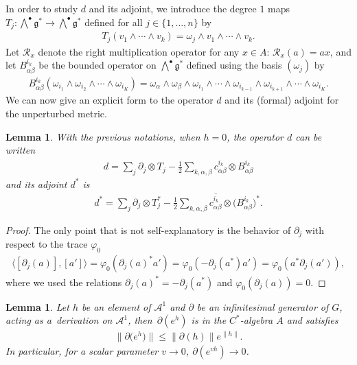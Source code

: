 \documentclass[pdftex]{sigma}
\newtheorem{Lemma}[Theorem]{Lemma}
\newcommand{\Aa}{\mathcal{A}}
\newcommand{\LieG}{\mathfrak{g}}
\newcommand{\RightMult}{\mathcal{R}}
\numberwithin{equation}{section}
\begin{document}
In order to study $d$ and its adjoint, we introduce the degree $1$ maps $T_j \colon \bigwedge^\bullet \LieG^* \to \bigwedge^\bullet \LieG^*$ def\/ined for all $j \in \{1, \ldots, n\}$ by
\begin{gather*}
T_j( v_1 \wedge \cdots \wedge v_k) = \omega_j \wedge v_1 \wedge \cdots \wedge v_k.
\end{gather*}
Let $\RightMult_{x}$ denote the right multiplication operator for any $x \in A$: $\RightMult_{x}(a) = a x$, and let $B^{i_k}_{\alpha \beta}$ be the bounded operator on $\bigwedge^\bullet \LieG^*$ def\/ined using the basis $(\omega_j)$ by
\begin{gather*}
B^{i_k}_{\alpha \beta}( \omega_{i_1} \wedge \omega_{i_2} \wedge \cdots \wedge \omega_{i_K}) = \omega_\alpha \wedge \omega_\beta \wedge \omega_{i_1} \wedge \cdots \wedge \omega_{i_{k-1}} \wedge \omega_{i_{k+1}} \wedge \cdots \wedge \omega_{i_K}.
\end{gather*}
We can now give an explicit form to the operator $d$ and its (formal) adjoint for the unperturbed metric.
\begin{Lemma}
\label{Lem:Formed}
With the previous notations, when $h = 0$, the operator $d$ can be written
\begin{gather*}
d = \sum_j \partial_j \otimes T_j - \frac{1}{2} \sum_{k,\alpha,\beta} c^{i_k}_{\alpha \beta} \otimes B^{i_k}_{\alpha \beta}
\end{gather*}
and its adjoint $d^*$ is
\begin{gather*}
d^* = \sum_j \partial_j \otimes T_j^* - \frac{1}{2} \sum_{k,\alpha, \beta} \overline{c^{i_k}_{\alpha \beta}} \otimes \big(B^{i_k}_{\alpha \beta}\big)^*.
\end{gather*}
\end{Lemma}

\begin{proof}
The only point that is not self-explanatory is the behavior of $\partial_j$ with respect to the trace $\varphi_0$
\begin{gather*}
\langle [\partial_j(a)], [a'] \rangle = \varphi_0( \partial_j(a)^* a') = \varphi_0( -\partial_j(a^*) a') = \varphi_0(a^* \partial_j(a')),
\end{gather*}
where we used the relations $\partial_j(a)^* = - \partial_j(a^*)$ and $\varphi_0( \partial_j(a)) = 0$.
\end{proof}

\begin{Lemma}
\label{Lem:CVExp}
Let $h$ be an element of $\Aa^1$ and $\partial $ be an infinitesimal generator of $G$, acting as a~derivation on $\Aa^1$, then~$\partial ( e^{h} )$ is in the $C^*$-algebra $A$ and satisfies
\begin{gather*}
\big\| \partial \big( e^{h} \big) \big\| \leqslant \| \partial (h) \| e^{\| h\| }.
\end{gather*}
In particular, for a scalar parameter $v \to 0$, $\partial (e^{v h}) \to 0$.
\end{Lemma}
\end{document}
